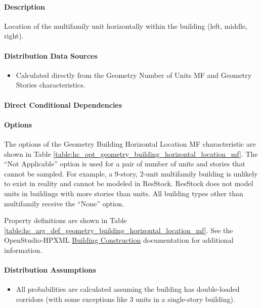 \paragraph{Description}
% 
Location of the multifamily unit horizontally within the building (left, middle, right).

\paragraph{Distribution Data Sources}
% 
\begin{itemize}
    \item Calculated directly from the Geometry Number of Units MF and Geometry Stories characteristics.
\end{itemize}

\paragraph{Direct Conditional Dependencies}


\paragraph{Options}
The options of the Geometry Building Horizontal Location MF characteristic are shown in Table \ref{table:hc_opt_geometry_building_horizontal_location_mf}. The ``Not Applicable'' option is used for a pair of number of units and stories that cannot be sampled. For example, a 9-story, 2-unit multifamily building is unlikely to exist in reality and cannot be modeled in ResStock. ResStock does not model units in buildings with more stories than units. All building types other than multifamily receive the ``None'' option.



Property definitions are shown in Table \ref{table:hc_arg_def_geometry_building_horizontal_location_mf}. See the OpenStudio-HPXML \href{https://openstudio-hpxml.readthedocs.io/en/v1.10.0/workflow_inputs.html#hpxml-building-construction}{Building Construction} documentation for additional information.



\paragraph{Distribution Assumptions}
% 
\begin{itemize}
    \item All probabilities are calculated assuming the building has double-loaded corridors (with some exceptions like 3 units in a single-story building).
\end{itemize}
